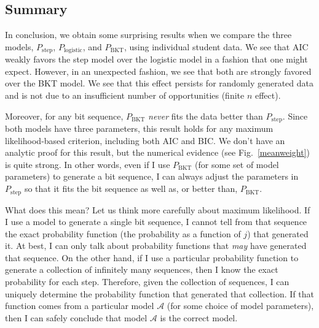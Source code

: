 \documentclass{edm_template}
\begin{document}
\subsection{Summary}

In conclusion, we obtain some surprising results when we compare
the three models,  $P_\mathrm{step}$, $P_\mathrm{logistic}$, and
$P_\mathrm{BKT}$, using individual student data.   We see that AIC
weakly favors the step model over the logistic model in a fashion 
that one might expect.  However, in an unexpected fashion, we see 
that both are strongly favored over the BKT model.
We see that this effect persists for
randomly generated data and is not due to an insufficient number
of opportunities (finite $n$ effect).

Moreover, for any bit sequence,  $P_\mathrm{BKT}$ {\em never}
fits the data better than $P_\mathrm{step}$.  Since 
both models have three parameters, this result holds for any maximum
likelihood-based criterion, including both AIC and BIC.  We don't have
an analytic proof for this result, 
but the numerical evidence (see Fig.~\ref{meanweight}) is quite strong.
In other words, even if I use $P_\mathrm{BKT}$ (for some set of model parameters) 
to generate a bit sequence, I can
always adjust the parameters in $P_\mathrm{step}$ so that it
fits the bit sequence as well as, or better than, $P_\mathrm{BKT}$.




What does this mean?  Let us think
more carefully about maximum likelihood.
If I use a model to generate a single bit sequence, I cannot tell from
that sequence the exact probability function (the probability as a
function of $j$) that generated it.  At best, I can only
talk about probability functions that {\em may} have generated that sequence.
On the other hand, if I use a particular probability function to generate a collection 
of infinitely many
sequences, then I know the exact probability for each step.
Therefore, given the collection of sequences, I can uniquely determine the 
probability function that generated that collection. If that function comes from a
particular model $\mathcal{A}$ (for some choice of model parameters),
then I can safely conclude that model $\mathcal{A}$ is the correct model.
\end{document}
